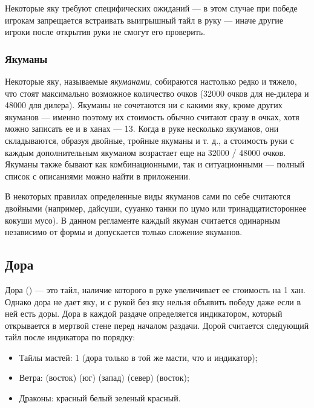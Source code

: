 Некоторые яку требуют специфических ожиданий --- в этом случае при победе игрокам запрещается встраивать выигрышный тайл в руку --- иначе другие игроки после открытия руки не смогут его проверить.

\subsubsection{Якуманы}

Некоторые яку, называемые \textit{якуманами}, собираются настолько редко и тяжело, что стоят максимально возможное количество очков (32000 очков для не-дилера и 48000 для дилера). Якуманы не сочетаются ни с какими яку, кроме других якуманов --- именно поэтому их стоимость обычно считают сразу в очках, хотя можно записать ее и в ханах --- 13. Когда в руке несколько якуманов, они складываются, образуя двойные, тройные якуманы и т. д., а стоимость руки с каждым дополнительным якуманом возрастает еще на 32000 / 48000 очков. Якуманы также бывают как комбинационными, так и ситуационными --- полный список с описаниями можно найти в приложении.

В некоторых правилах определенные виды якуманов сами по себе считаются двойными (например, дайсуши, сууанко танки по цумо или тринадцатистороннее кокуши мусо). В данном регламенте каждый якуман считается одинарным независимо от формы и допускается только сложение якуманов.

\subsection{Дора}

Дора () --- это тайл, наличие которого в руке увеличивает ее стоимость на 1 хан. Однако дора не дает яку, и с рукой без яку нельзя объявить победу даже если в ней есть доры. Дора в каждой раздаче определяется индикатором, который открывается в мертвой стене перед началом раздачи. Дорой считается следующий тайл после индикатора по порядку:
\begin{itemize}
	\item Тайлы мастей: 1 (дора только в той же масти, что и индикатор);
	\item Ветра:  (восток)\rightarrow
	 (юг)\rightarrow
	 (запад)\rightarrow
	 (север)\rightarrow
	 (восток);
	\item Драконы: красный\rightarrow
	белый\rightarrow
	зеленый\rightarrow
	красный.
\end{itemize}

